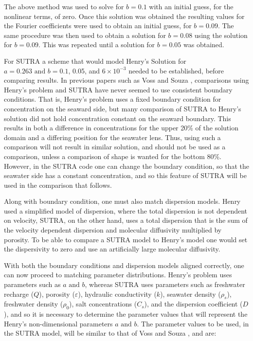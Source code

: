 \documentclass{article}
\newcommand{\spbox}[1]{ \text{ #1 }} %
\begin{document}
 The above method was used to solve for $b=0.1$ with an initial guess, for the
 nonlinear terms, of zero. Once this solution was obtained the resulting values
 for the Fourier coefficients were used to obtain an initial guess, for
 $b=0.09$. The same procedure was then used to obtain a solution for $b=0.08$
 using the solution for $b=0.09$. This was repeated until a solution for
 $b=0.05$ was obtained.

 For SUTRA a scheme that would model Henry's Solution for $a=0.263 \spbox{and} b=0.1$,
 0.05, and $6\times 10^{-3} $ needed to be established, before comparing
 results. In previous papers such as Voss and Souza \cite{Voss}, comparisons
 using Henry's problem and SUTRA have never seemed to use consistent boundary
 conditions. That is, Henry's problem uses a fixed boundary condition for
 concentration on the seaward side, but many comparison of SUTRA to Henry's
 solution did not hold concentration constant on the seaward boundary. This
 results in both a difference in concentrations for the upper 20\% of the
 solution domain and a differing position for the seawater lens. Thus, using
 such a comparison will not result in similar solution, and should not be used
 as a comparison, unless a comparison of shape is wanted for the bottom 80\%.
 However, in the SUTRA code one can change the boundary condition, so that the
 seawater side has a constant concentration, and so this feature of SUTRA will
 be used in the comparison that follows.

Along with boundary condition, one must also match dispersion models. Henry used
a simplified model of dispersion, where the total dispersion is not dependent on
velocity, SUTRA, on the other hand, uses a total dispersion that is the sum of
the velocity dependent dispersion and molecular diffusivity multiplied by
porosity. To be able to compare a SUTRA model to Henry's model one would set the
dispersivity to zero and use an artificially large molecular diffusivity. 

With both the boundary conditions and dispersion models aligned correctly, one
can now proceed to matching parameter distributions. Henry's problem uses
parameters such as $a \spbox{and} b$, whereas SUTRA uses parameters such as freshwater
recharge ($Q$), porosity ($\varepsilon $), hydraulic conductivity ($k$),
seawater density ($\rho _{s}$), freshwater density ($\rho _{0}$), salt
concentrations ($C_{s}$), and the dispersion coefficient ($D$), and so it is
necessary to determine the parameter values that will represent the Henry's
non-dimensional parameters $a \spbox{and} b$. The parameter values to be used, in the
SUTRA model, will be similar to that of Voss and Souza \cite{Voss}, and are:
\end{document}
